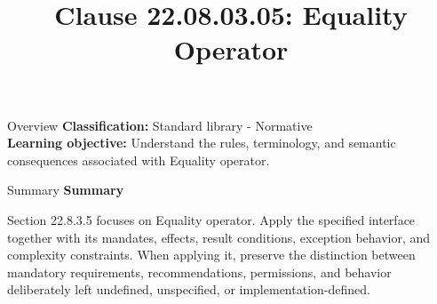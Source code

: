 \documentclass[10pt,letterpaper]{article}
\title{Clause 22.08.03.05: Equality Operator}
\author{}
\date{}
\begin{document}
\maketitle
\begin{CornellOverviewBox}{Overview}
\textbf{Classification:} Standard library - Normative\\[2pt]
\textbf{Learning objective:} Understand the rules, terminology, and semantic consequences associated with Equality operator.
\end{CornellOverviewBox}\begin{CornellSummaryBox}{Summary}
{\sffamily\bfseries\color{Accent} Summary}\par\vspace{3pt}Section 22.8.3.5 focuses on Equality operator. Apply the specified interface together with its mandates, effects, result conditions, exception behavior, and complexity constraints. When applying it, preserve the distinction between mandatory requirements, recommendations, permissions, and behavior deliberately left undefined, unspecified, or implementation-defined.
\end{CornellSummaryBox}
\end{document}
